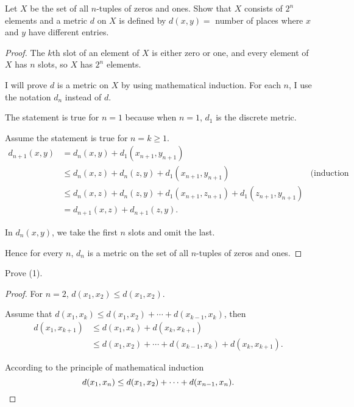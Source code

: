 \begin{exercise}\label{chapter1:section1:exercise10}
    Let $X$ be the set of all $n$-tuples of zeros and ones. Show that $X$ consists of $2^{n}$ elements and a metric $d$ on $X$ is defined by $d(x, y) =$ number of places where $x$ and $y$ have different entries.
\end{exercise}

\begin{proof}
    The $k$th slot of an element of $X$ is either zero or one, and every element of $X$ has $n$ slots, so $X$ has $2^{n}$ elements.

    I will prove $d$ is a metric on $X$ by using mathematical induction. For each $n$, I use the notation $d_{n}$ instead of $d$.

    The statement is true for $n = 1$ because when $n = 1$, $d_{1}$ is the discrete metric.

    Assume the statement is true for $n = k\geq 1$.
    \begin{align*}
        d_{n+1}(x, y) & = d_{n}(x, y) + d_{1}(x_{n+1}, y_{n+1})                                                                            \\
                      & \leq d_{n}(x, z) + d_{n}(z, y) + d_{1}(x_{n+1}, y_{n+1})                           & \text{(induction hypothesis)} \\
                      & \leq d_{n}(x, z) + d_{n}(z, y) + d_{1}(x_{n+1}, z_{n+1}) + d_{1}(z_{n+1}, y_{n+1})                                 \\
                      & = d_{n+1}(x, z) + d_{n+1}(z, y).
    \end{align*}

    In $d_{n}(x, y)$, we take the first $n$ slots and omit the last.

    Hence for every $n$, $d_{n}$ is a metric on the set of all $n$-tuples of zeros and ones.
\end{proof}

\begin{exercise}\label{chapter1:section1:exercise11}
    Prove (1).
\end{exercise}

\begin{proof}
    For $n = 2$, $d(x_{1}, x_{2})\leq d(x_{1}, x_{2})$.

    Assume that $d(x_{1}, x_{k})\leq d(x_{1}, x_{2}) + \cdots + d(x_{k-1}, x_{k})$, then
    \begin{align*}
        d(x_{1}, x_{k+1}) & \leq d(x_{1}, x_{k}) + d(x_{k}, x_{k+1})                               \\
                          & \leq d(x_{1}, x_{2}) + \cdots + d(x_{k-1}, x_{k}) + d(x_{k}, x_{k+1}).
    \end{align*}

    According to the principle of mathematical induction
    \[
        d(x_{1}, x_{n}) \leq d(x_{1}, x_{2}) + \cdots + d(x_{n-1}, x_{n}).\qedhere
    \]
\end{proof}

